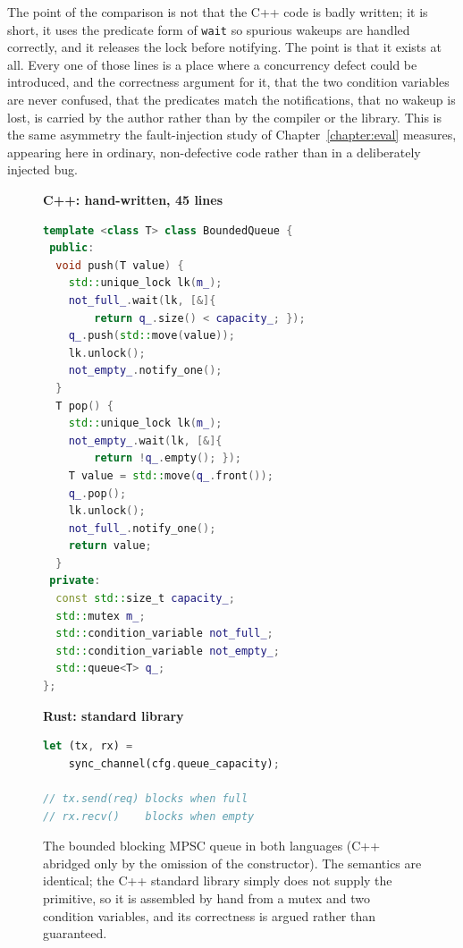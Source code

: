 \documentclass[english,twoside,openright,a4paper,censored,csm,software-track-2020]{HYthesisML}
\begin{document}
The point of the comparison is not that the C++ code is badly written; it is short, it uses
the predicate form of \texttt{wait} so spurious wakeups are handled correctly, and it releases
the lock before notifying. The point is that it exists at all. Every one of those lines is a
place where a concurrency defect could be introduced, and the correctness argument for it,
that the two condition variables are never confused, that the predicates match the
notifications, that no wakeup is lost, is carried by the author rather than by the compiler or
the library. This is the same asymmetry the fault-injection study of Chapter~\ref{chapter:eval}
measures, appearing here in ordinary, non-defective code rather than in a deliberately injected
bug.

\begin{figure}
\begin{minipage}[t]{0.52\linewidth}
\textbf{\footnotesize C++: hand-written, 45 lines}
\begin{lstlisting}[language=C++]
template <class T> class BoundedQueue {
 public:
  void push(T value) {
    std::unique_lock lk(m_);
    not_full_.wait(lk, [&]{
        return q_.size() < capacity_; });
    q_.push(std::move(value));
    lk.unlock();
    not_empty_.notify_one();
  }
  T pop() {
    std::unique_lock lk(m_);
    not_empty_.wait(lk, [&]{
        return !q_.empty(); });
    T value = std::move(q_.front());
    q_.pop();
    lk.unlock();
    not_full_.notify_one();
    return value;
  }
 private:
  const std::size_t capacity_;
  std::mutex m_;
  std::condition_variable not_full_;
  std::condition_variable not_empty_;
  std::queue<T> q_;
};
\end{lstlisting}
\end{minipage}\hfill
\begin{minipage}[t]{0.44\linewidth}
\textbf{\footnotesize Rust: standard library}
\begin{lstlisting}[language=Rust]
let (tx, rx) =
    sync_channel(cfg.queue_capacity);

// tx.send(req) blocks when full
// rx.recv()    blocks when empty
\end{lstlisting}
\end{minipage}
\caption{The bounded blocking MPSC queue in both languages (C++ abridged only by the omission
of the constructor). The semantics are identical; the C++ standard library simply does not
supply the primitive, so it is assembled by hand from a mutex and two condition variables,
and its correctness is argued rather than
guaranteed.\label{lst:queue}}
\end{figure}
\end{document}
